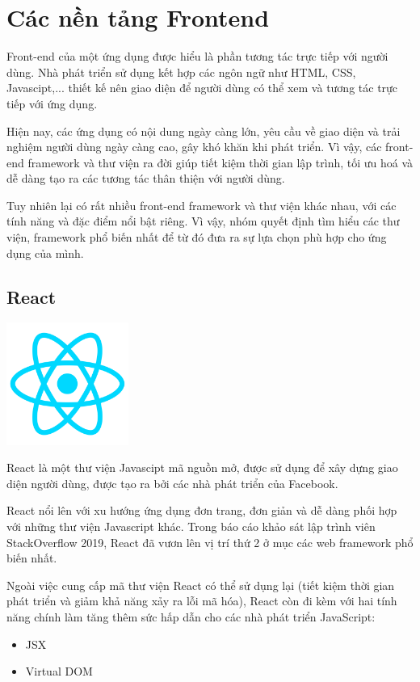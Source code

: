 \section{Các nền tảng Frontend}
Front-end của một ứng dụng được hiểu là phần tương tác trực tiếp với người dùng. Nhà phát triển sử dụng kết hợp các ngôn ngữ như HTML, CSS, Javascipt,... thiết kế nên giao diện để người dùng có thể xem và tương tác trực tiếp với ứng dụng.

Hiện nay, các ứng dụng có nội dung ngày càng lớn, yêu cầu về giao diện và trải nghiệm người dùng ngày càng cao, gây khó khăn khi phát triển. Vì vậy, các front-end framework và thư viện ra đời giúp tiết kiệm thời gian lập trình, tối ưu hoá và dễ dàng tạo ra các tương tác thân thiện với người dùng.

Tuy nhiên lại có rất nhiều front-end framework và thư viện khác nhau, với các tính năng và đặc điểm nổi bật riêng. Vì vậy, nhóm quyết định tìm hiểu các thư viện, framework phổ biến nhất để từ đó đưa ra sự lựa chọn phù hợp cho ứng dụng của mình.
\subsection{React}
\begin{center}
  \captionsetup{type=figure}
  \includegraphics[width=4cm]{img/React_logo.png}
\end{center}
React là một thư viện Javascipt mã nguồn mở, được sử dụng để xây dựng giao diện người dùng, được tạo ra bởi các nhà phát triển của Facebook.

React nổi lên với xu hướng ứng dụng đơn trang, đơn giản và dễ dàng phối hợp với những thư viện Javascript khác. Trong báo cáo khảo sát lập trình viên StackOverflow 2019, React đã vươn lên vị trí thứ 2 ở mục các web framework phổ biến nhất.

Ngoài việc cung cấp mã thư viện React có thể sử dụng lại (tiết kiệm thời gian phát triển và giảm khả năng xảy ra lỗi mã hóa), React còn đi kèm với hai tính năng chính làm tăng thêm sức hấp dẫn cho các nhà phát triển JavaScript:
\begin{itemize}
    \item JSX
    \item Virtual DOM
\end{itemize}

